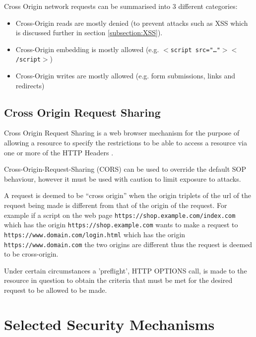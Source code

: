 \documentclass{mscreport}
\begin{document}
\vspace{0.3cm} \noindent
Cross Origin network requests can be summarised into 3 different categories:
\begin{itemize}
	\setlength\itemsep{0.1em}
	\item Cross-Origin reads are mostly denied (to prevent attacks such as XSS which is discussed further in section \ref{subsection:XSS}).
	\item Cross-Origin embedding is mostly allowed (e.g. \texttt{$<$script src="…"$><$/script$>$})
	\item Cross-Origin writes are mostly allowed (e.g. form submissions, links and redirects)
\end{itemize}

\subsection{Cross Origin Request Sharing}
\label{section:Cross-Origin-Request-Sharing}

\noindent
Cross Origin Request Sharing is a web browser mechanism for the purpose of allowing a resource to specify the restrictions to be able to access a resource via one or more of the HTTP Headers \cite{Apple2006-hk}.

\vspace{0.3cm} \noindent
Cross-Origin-Request-Sharing (CORS) can be used to override the default SOP behaviour, however it must be used with caution to limit exposure to attacks.

\vspace{0.3cm} \noindent
A request is deemed to be ``cross origin'' when the origin triplets of the url of the request being made is different from that of the origin of the request. For example if a script on the web page \texttt{https://shop.example.com/index.com} which has the origin \texttt{https://shop.example.com} wants to make a request to \texttt{https://www.domain.com/login.html} which has the origin \texttt{https://www.domain.com} the two origins are different thus the request is deemed to be cross-origin.

\vspace{0.3cm} \noindent
Under certain circumstances a 'preflight', HTTP OPTIONS call, is made to the resource in question to obtain the criteria that must be met for the desired request to be allowed to be made.

\newpage

\section{Selected Security Mechanisms}
\label{section:selected_security_mechanisms}
\end{document}
